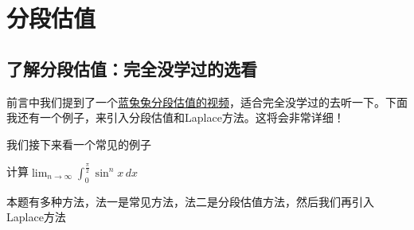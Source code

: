 \chapter{分段估值}

\section{了解分段估值：完全没学过的选看}
前言中我们提到了一个\href{https://www.bilibili.com/video/BV1Xm4y1q7kV/?share_source=copy_web&vd_source=270527b9d8a800872b201575fba2747c}{蓝兔兔分段估值的视频}，适合完全没学过的去听一下。下面我还有一个例子，来引入分段估值和Laplace方法。这将会非常详细！

我们接下来看一个常见的例子

\vspace{1mm}
\begin{example}\label{积分正弦n次}
计算$ \displaystyle \lim_{n \to \infty} \int_{0}^{\frac{\pi}{2}} \sin^{n}x \,dx$
\end{example}

\begin{remark}
本题有多种方法，法一是常见方法，法二是分段估值方法，然后我们再引入Laplace方法
\end{remark}

